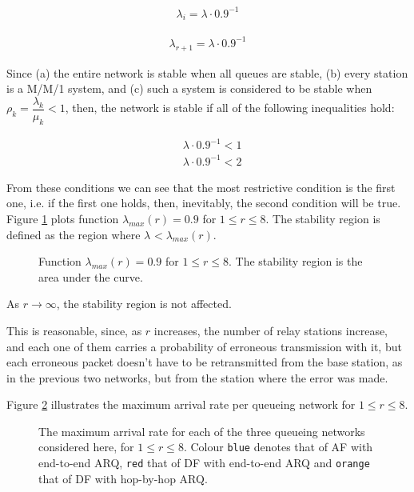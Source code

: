 \begin{align}
  \lambda_i = \lambda \cdot 0.9^{-1}
  \label{eq:04_stability_region_df_hbh_lambda_i}
\end{align}

\begin{align}
  \lambda_{r+1} = \lambda \cdot 0.9^{-1}
  \label{eq:04_stability_region_df_hbh_lambda_r_plus_one}
\end{align}

Since (a) the entire network is stable when all queues are stable, (b) every
station is a M/M/1 system, and (c) such a system is considered to be stable
when $\rho_k = \dfrac{\lambda_k}{\mu_k} < 1$, then, the network is stable if all
of the following inequalities hold:

\begin{align*}
  &\lambda \cdot 0.9^{-1} < 1 \\
  &\lambda \cdot 0.9^{-1} < 2
\end{align*}

From these conditions  we can see that the most restrictive condition is the
first one, i.e. if the first one holds, then, inevitably, the second condition
will be true. Figure \ref{fig:04_stability_region_df_hbh} plots function
$\lambda_{max}(r) = 0.9$ for $1 \leq r \leq 8$. The stability
region is defined as the region where $\lambda_{} < \lambda_{max}(r)$.

\begin{figure}\centering
  
  \caption{Function $\lambda_{max}(r) = 0.9$ for $1 \leq r \leq 8$.
    The stability region is the area under the curve.}
  \label{fig:04_stability_region_df_hbh}
\end{figure}

As $r \to \infty$, the stability region is not affected.

This is reasonable, since, as $r$ increases, the number of relay stations
increase, and each one of them carries a probability of erroneous transmission
with it, but each erroneous packet doesn't have to be retransmitted from the
base station, as in the previous two networks, but from the station where the
error was made.

Figure \ref{fig:04_stability_regions} illustrates the maximum arrival rate
per queueing network for $1 \leq r \leq 8$.

\begin{figure}[H]\centering
  
  \caption{The maximum arrival rate for each of the three queueing networks
    considered here, for $1 \leq r \leq 8$. Colour \texttt{blue} denotes that of
    AF with end-to-end ARQ, \texttt{red} that of DF with end-to-end ARQ and
    \texttt{orange} that of DF with hop-by-hop ARQ.}
  \label{fig:04_stability_regions}
\end{figure}
